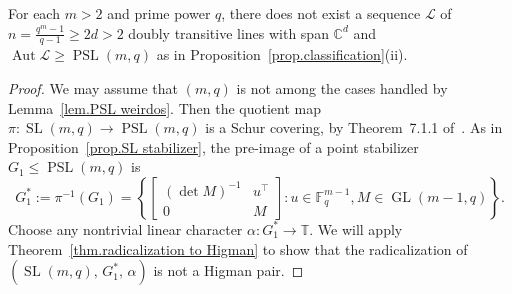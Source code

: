 \begin{lemma}
For each $m > 2$ and prime power $q$, there does not exist a sequence $\mathscr{L}$ of $n = \frac{q^m-1}{q-1} \geq 2d > 2$ doubly transitive lines with span $\mathbb{C}^d$ and $\operatorname{Aut} \mathscr{L} \geq \operatorname{PSL}(m,q)$ as in Proposition~\ref{prop.classification}(ii).
\end{lemma}

\begin{proof}
We may assume that $(m,q)$ is not among the cases handled by Lemma~\ref{lem.PSL weirdos}.
Then the quotient map $\pi \colon \operatorname{SL}(m,q) \to \operatorname{PSL}(m,q)$ is a Schur covering, by Theorem~7.1.1 of~\cite{Karpilovsky:87}.
As in Proposition~\ref{prop.SL stabilizer}, the pre-image of a point stabilizer $G_1 \leq \operatorname{PSL}(m,q)$ is
\[ G_1^* := \pi^{-1}(G_1) =\left\{
\begin{bmatrix}
(\det M)^{-1}&u^\top\\0&M
\end{bmatrix}
: u\in\mathbb{F}_q^{m-1},M\in\operatorname{GL}(m-1,q)
\right\}.
\]
Choose any nontrivial linear character $\alpha \colon G_1^* \to \mathbb{T}$.
We will apply Theorem~\ref{thm.radicalization to Higman} to show that the radicalization of $(\operatorname{SL}(m,q),\, G_1^*,\, \alpha)$ is not a Higman pair.


\end{proof}
